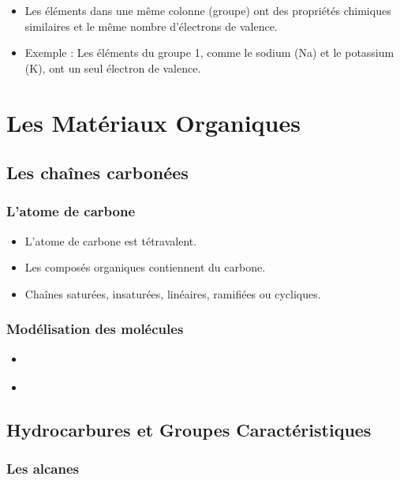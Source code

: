 \documentclass{article}
\newif\ifWITHCORRECTION
\newcommand{\corrige}[2]{\ifWITHCORRECTION #1 \else \underline{\hspace{#2}} \fi}
\begin{document}
\begin{tcolorbox}[colback=blue!10!white, colframe=blue!75!black, title=Application : Position des éléments]
  \begin{itemize}[noitemsep]
    \item Les éléments dans une même colonne (groupe) ont des propriétés chimiques similaires et le même nombre d'électrons de valence.
    \item Exemple : Les éléments du groupe 1, comme le sodium (Na) et le potassium (K), ont un seul électron de valence.
  \end{itemize}
\end{tcolorbox}

\section{Les Matériaux Organiques}

\subsection{Les chaînes carbonées}
\subsubsection{L'atome de carbone}
\begin{itemize}[noitemsep]
    \item L'atome de carbone est tétravalent.
    \item Les composés organiques contiennent du carbone.
    \item Chaînes saturées, insaturées, linéaires, ramifiées ou cycliques.
\end{itemize}

\subsubsection{Modélisation des molécules}
\begin{itemize}[noitemsep]
    \item \corrige{Formule brute : CH$_4$}{2cm}
    \item \corrige{Formule développée : H--C--H}{2cm}
\end{itemize}

\subsection{Hydrocarbures et Groupes Caractéristiques}
\subsubsection{Les alcanes}
\begin{tcolorbox}[colback=green!10!white, colframe=green!75!black, title=Définition : ]
  \corrige{Les alcanes sont des hydrocarbures saturés ne comportant que des liaisons simples entre les atomes de carbone.}{7cm}
\end{tcolorbox}
\end{document}
